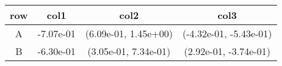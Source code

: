 \begin{tabular}{cccc}
\toprule
row&col1&col2&col3\tabularnewline
\midrule
A&-7.07e-01& (6.09e-01, 1.45e+00)& (-4.32e-01, -5.43e-01)\tabularnewline
B&-6.30e-01& (3.05e-01, 7.34e-01)& (2.92e-01, -3.74e-01)\tabularnewline
\bottomrule
\end{tabular}
